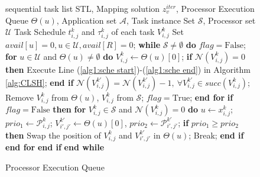 \documentclass{IEEEtaes}
\makeatletter
\newcommand{\removelatexerror}{\let\@latex@error\@gobble}
\makeatother
\begin{document}
\begin{figure}[!t]
\renewcommand{\algorithmicrequire}{\textbf{Input:}}
\renewcommand{\algorithmicensure}{\textbf{Output:}}
\removelatexerror
\begin{algorithm}[H]
    \caption{ Processor Execution Queue}
    \begin{algorithmic}[1]
        \REQUIRE  sequential task list STL, Mapping solution $z^{iter}_{v}$, Processor Execution Queue $\Theta(u)$, Application set $\mathcal{A}$, Task instance Set $\mathcal{S}$, Processor set $\mathcal{U}$%
        \ENSURE Task Schedule $t_{i,j}^k$ and $\tau_{i,j}^k$ of each task $V_{i,j}^{k}$  %
        \STATE Set $avail[u]=0,u\in \mathcal{U},avail[R]=0$;
        \STATE \textbf{while} $\mathcal{S}\ne \emptyset$ \textbf{do}
        \STATE \quad $flag=\text{False}$;
        \STATE \quad \textbf{for} $u\in \mathcal{U}$ and $\Theta(u)\ne \emptyset$ \textbf{do}
        \STATE \quad\quad $V_{i,j}^{k}\gets \Theta(u)[0]$;
        \STATE \quad\quad \textbf{if} $\mathcal{N}(V_{i,j}^{k})=0$ \textbf{then}
        \label{alg2:check pred}
        \STATE \quad\quad\quad Execute Line (\ref{alg1:sche start})-(\ref{alg1:sche end}) in Algorithm \ref{alg:CLSH};
        \label{alg2:same exe}
        \STATE \quad\quad \textbf{end if}
        \STATE \quad\quad$ \mathcal{N}(V_{i,j}^{k'})=\mathcal{N}(V_{i,j}^{k'})-1,\ \forall V_{i,j}^{k'}\in succ(V_{i,j}^{k})$;
        \STATE \quad\quad Remove $V_{i,j}^{k}$ from $\Theta(u)$, $V_{i,j}^{k}$ from $\mathcal{S}$;
        \STATE \quad\quad $flag=\text{True}$;
        \STATE \quad \textbf{end for}
        \STATE \quad\textbf{if} $flag=\text{False}$ \textbf{then}
        \label{alg2:swap begin}
        \STATE \quad\quad \textbf{for} $V_{i,j}^{k}\in \mathcal{S}$ and $\mathcal{N}(V_{i,j}^{k})=0$ \textbf{do}
        \STATE \quad\quad\quad $u\gets x_{i,j}^{k}$;
        \STATE \quad\quad\quad$prio_1\gets\mathcal{P}_{i,j}^{k}$;
        \label{alg2:prio begin}
        \STATE \quad\quad\quad$V_{i',j'}^{k'}\gets\Theta(u)[0]$, $prio_2\gets\mathcal{P}_{i',j'}^{k'}$;
        \STATE \quad\quad\quad \textbf{if} $prio_1\ge prio_2$ \textbf{then}
        \STATE \quad\quad\quad\quad Swap the position of $V_{i,j}^{k}$ and $V_{i',j'}^{k'}$ in $\Theta(u)$;
        \label{alg2:prio end}
        \STATE \quad\quad\quad\quad Break;
        \STATE \quad\quad\quad\textbf{end if}
        \STATE \quad\quad\textbf{end for}
        \STATE \quad\textbf{end if}
        \label{alg2:swap end}
        \STATE \textbf{end while}
    \end{algorithmic}
    \label{alg:CLSH2}
\end{algorithm}
\end{figure}
\end{document}
